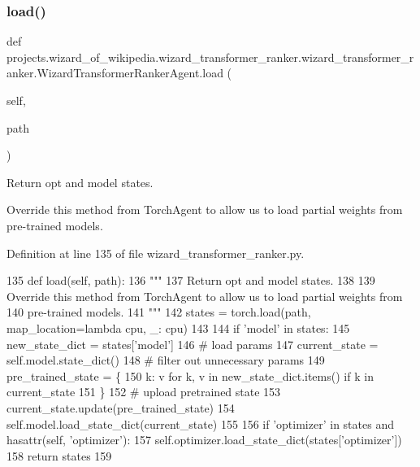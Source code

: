 \subsubsection{\texorpdfstring{load()}{load()}}
{\footnotesize\ttfamily def projects.\+wizard\+\_\+of\+\_\+wikipedia.\+wizard\+\_\+transformer\+\_\+ranker.\+wizard\+\_\+transformer\+\_\+ranker.\+Wizard\+Transformer\+Ranker\+Agent.\+load (\begin{DoxyParamCaption}\item[{}]{self,  }\item[{}]{path }\end{DoxyParamCaption})}

\begin{DoxyVerb}Return opt and model states.

Override this method from TorchAgent to allow us to load partial weights from
pre-trained models.
\end{DoxyVerb}
 

Definition at line 135 of file wizard\+\_\+transformer\+\_\+ranker.\+py.


\begin{DoxyCode}
135     \textcolor{keyword}{def }load(self, path):
136         \textcolor{stringliteral}{"""}
137 \textcolor{stringliteral}{        Return opt and model states.}
138 \textcolor{stringliteral}{}
139 \textcolor{stringliteral}{        Override this method from TorchAgent to allow us to load partial weights from}
140 \textcolor{stringliteral}{        pre-trained models.}
141 \textcolor{stringliteral}{        """}
142         states = torch.load(path, map\_location=\textcolor{keyword}{lambda} cpu, \_: cpu)
143 
144         \textcolor{keywordflow}{if} \textcolor{stringliteral}{'model'} \textcolor{keywordflow}{in} states:
145             new\_state\_dict = states[\textcolor{stringliteral}{'model'}]
146             \textcolor{comment}{# load params}
147             current\_state = self.model.state\_dict()
148             \textcolor{comment}{# filter out unnecessary params}
149             pre\_trained\_state = \{
150                 k: v \textcolor{keywordflow}{for} k, v \textcolor{keywordflow}{in} new\_state\_dict.items() \textcolor{keywordflow}{if} k \textcolor{keywordflow}{in} current\_state
151             \}
152             \textcolor{comment}{# upload pretrained state}
153             current\_state.update(pre\_trained\_state)
154             self.model.load\_state\_dict(current\_state)
155 
156         \textcolor{keywordflow}{if} \textcolor{stringliteral}{'optimizer'} \textcolor{keywordflow}{in} states \textcolor{keywordflow}{and} hasattr(self, \textcolor{stringliteral}{'optimizer'}):
157             self.optimizer.load\_state\_dict(states[\textcolor{stringliteral}{'optimizer'}])
158         \textcolor{keywordflow}{return} states
159 \end{DoxyCode}


